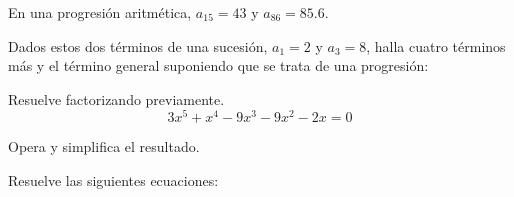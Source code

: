 \documentclass[12pt]{exam}
\begin{document}
\begin{questions}

\question En una progresión aritmética, \( a_{15} = 43 \) y \( a_{86} = 85.6 \).

\question Dados estos dos términos de una sucesión, \( a_1 = 2 \) y \( a_3 = 8 \), halla cuatro términos más y el término general suponiendo que se trata de una progresión:


\question Resuelve factorizando previamente.
\[
3x^5 + x^4 - 9x^3 - 9x^2 - 2x = 0
\]

\question Opera y simplifica el resultado.

\question Resuelve las siguientes ecuaciones:
\end{questions}
\end{document}
